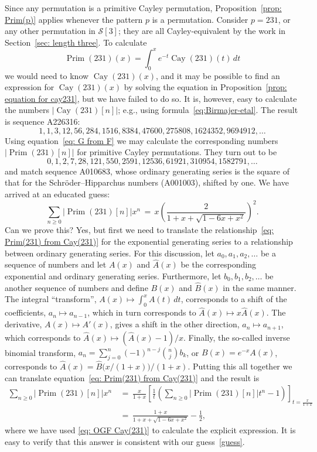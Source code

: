\documentclass[a4paper, 11pt]{article}
\DeclareMathOperator{\Cay}{Cay}
\DeclareMathOperator{\Prim}{Prim}
\newcommand{\Sym}{\mathcal{S}}
\theoremstyle{definition}
\begin{document}
Since any permutation is a primitive Cayley permutation,
Proposition~\ref{prop: Prim(p)} applies whenever the pattern $p$ is a
permutation. Consider $p=231$, or any other permutation in $\Sym[3]$; they are all
Cayley-equivalent by the work in Section~\ref{sec: length three}.
To calculate
\begin{equation}\label{eq: Prim(231) from Cay(231)}
  \Prim(231)(x) = \int_0^xe^{-t}\Cay(231)(t)\,dt
\end{equation}
we would need to know $\Cay(231)(x)$, and it may be possible
to find an expression for $\Cay(231)(x)$ by solving the
equation in Proposition~\ref{prop: equation for cay231}, but we have
failed to do so.
It is, however, easy to calculate the numbers $\bigl|\Cay(231)[n]\bigr|$;
e.g., using formula~\eqref{eq:Birmajer-etal}. The result is sequence A226316:
\[
  1, 1, 3, 12, 56, 284, 1516, 8384, 47600, 275808, 1624352, 9694912, \ldots
\]
Using equation~\eqref{eq: G from F} we may calculate the corresponding
numbers $\bigl|\Prim(231)[n]\bigr|$ for primitive Cayley
permutations. They turn out to be
\[
  0,1,2,7,28,121,550,2591,12536,61921,310954,1582791, \ldots
\]
and match sequence A010683, whose ordinary generating series is the
square of that for the Schröder–Hipparchus numbers (A001003), shifted
by one. We have arrived at an educated guess:
\begin{equation}\label{guess}
  \sum_{n\geq 0}\bigl|\Prim(231)[n]\bigr| x^n \,=\,
  x\left( \frac{2}{1 + x + \sqrt{1 - 6x + x^2}} \right)^2.
\end{equation}
Can we prove this? Yes, but first we need to translate the
relationship~\eqref{eq: Prim(231) from Cay(231)} for the exponential
generating series to a relationship between ordinary generating
series. For this discussion, let $a_0, a_1, a_2, \dots$ be a sequence of
numbers and let $A(x)$ and $\hat{A}(x)$ be the corresponding exponential
and ordinary generating series. Furthermore, let $b_0, b_1, b_2, \dots$
be another sequence of numbers and define $B(x)$ and $\hat{B}(x)$
in the same manner. The integral ``transform'', $A(x)\mapsto \int_0^x A(t)\, dt$,
corresponds to a shift of the coefficients, $a_n\mapsto a_{n-1}$, which
in turn corresponds to $\hat{A}(x)\mapsto x\hat{A}(x)$. The derivative,
$A(x)\mapsto A'(x)$, gives a shift in the other direction,
$a_n\mapsto a_{n+1}$, which corresponds to
$\hat{A}(x)\mapsto (\hat{A}(x)-1)/x$. Finally, the so-called inverse
binomial transform, $a_n = \sum_{j=0}^n(-1)^{n-j}\binom{n}{j}b_k$, or
$B(x)=e^{-x}A(x)$, corresponds to
$\hat{A}(x)=\hat{B}\bigl(x/(1+x)\bigr)/(1+x)$.  Putting this all
together we can translate equation~\eqref{eq: Prim(231) from Cay(231)}
and the result is
\begin{align*}
  \sum_{n\geq 0}\bigl|\Prim(231)[n]\bigr| x^n
  &\,=\, \frac{x}{1+x}\left[\frac{1}{t}\left(\sum_{n\geq 0}\bigl|\Prim(231)[n]\bigr| t^n - 1\right) \right]_{t=\frac{x}{1+x}} \\
  &\,=\, \frac{1+x}{1+x+\sqrt{1-6x+x^2}} - \frac{1}{2},
\end{align*}
where we have used \eqref{eq: OGF Cay(231)} to
calculate the explicit expression. It is easy to verify that this answer
is consistent with our guess~\eqref{guess}.
\end{document}
